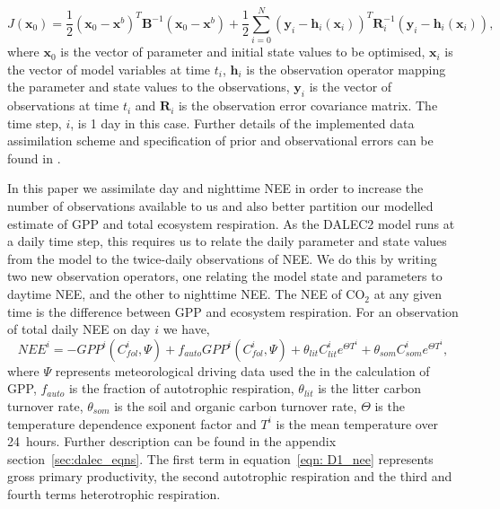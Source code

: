 \begin{equation}
J(\textbf{x}_0) = \frac{1}{2}(\textbf{x}_0-\textbf{x}^b)^{T}\textbf{B}^{-1}(\textbf{x}_0-\textbf{x}^b)+\frac{1}{2}\sum_{i=0}^{N}(\textbf{y}_i-\textbf{h}_i(\textbf{x}_i))^{T}\textbf{R}_{i}^{-1}(\textbf{y}_i-\textbf{h}_i(\textbf{x}_i)),
\end{equation}
where $\textbf{x}_{0}$ is the vector of parameter and initial state values to be optimised, $\textbf{x}_{i}$ is the vector of model variables at time \(t_{i}\), $\textbf{h}_{i}$ is the observation operator mapping the parameter and state values to the observations, $\textbf{y}_{i}$ is the vector of observations at time \(t_i\) and $\textbf{R}_{i}$ is the observation error covariance matrix. The time step, \(i\), is 1 day in this case. Further details of the implemented data assimilation scheme and specification of prior and observational errors can be found in \citet{Pinnington2016299}. 

In this paper we assimilate day and nighttime NEE in order to increase the number of observations available to us and also better partition our modelled estimate of GPP and total ecosystem respiration. As the DALEC2 model runs at a daily time step, this requires us to relate the daily parameter and state values from the model to the twice-daily observations of NEE. We do this by writing two new observation operators, one relating the model state and parameters to daytime NEE, and the other to nighttime NEE. The NEE of CO\(_{2}\) at any given time is the difference between GPP and ecosystem respiration. For an observation of total daily NEE on day \(i\) we have,
\begin{equation}
NEE^{i}=-GPP^{i}(C_{fol}^{i}, \Psi) +f_{auto}GPP^{i}(C_{fol}^{i}, \Psi) + \theta_{lit}C_{lit}^i e^{\Theta T^{i}} + \theta_{som}C_{som}^i e^{\Theta T^{i}}, \label{eqn: D1_nee}
\end{equation}
where \(\Psi\) represents meteorological driving data used the in the calculation of GPP, \(f_{auto}\) is the fraction of autotrophic respiration, \(\theta_{lit}\) is the litter carbon turnover rate, \(\theta_{som}\) is the soil and organic carbon turnover rate, \(\Theta\) is the temperature dependence exponent factor and \(T^{i}\) is the mean temperature over 24~hours. Further description can be found in the appendix section~\ref{sec:dalec_eqns}. The first term in equation~\eqref{eqn: D1_nee} represents gross primary productivity, the second autotrophic respiration and the third and fourth terms heterotrophic respiration. 

